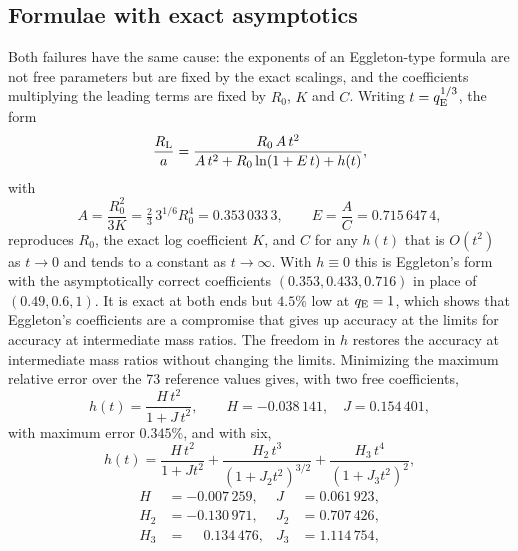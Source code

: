 \documentclass[twocolumn]{aastex702}
\newcommand{\qE}{q_{\rm E}}
\newcommand{\RL}{R_{\rm L}}
\begin{document}
\subsection{Formulae with exact asymptotics}

Both failures have the same cause: the exponents of an Eggleton-type formula are not free parameters but are fixed by the exact scalings, and the coefficients multiplying the leading terms are fixed by $R_0$, $K$ and $C$. Writing $t=\qE^{1/3}$, the form
\begin{equation}
\frac{\RL}{a}=\frac{R_0\,A\,t^2}{A\,t^2+R_0\ln(1+E\,t)+h(t)},
\label{eq:fit}
\end{equation}
with
\begin{equation}
A=\frac{R_0^2}{3K}=\tfrac23\,3^{1/6}R_0^4=0.353\,033\,3,\qquad E=\frac AC=0.715\,647\,4,
\end{equation}
reproduces $R_0$, the exact log coefficient $K$, and $C$ for any $h(t)$ that is $O(t^2)$ as $t\to0$ and tends to a constant as $t\to\infty$. With $h\equiv0$ this is Eggleton's form with the asymptotically correct coefficients $(0.353,0.433,0.716)$ in place of $(0.49,0.6,1)$. It is exact at both ends but $4.5\%$ low at $\qE=1$, which shows that Eggleton's coefficients are a compromise that gives up accuracy at the limits for accuracy at intermediate mass ratios. The freedom in $h$ restores the accuracy at intermediate mass ratios without changing the limits. Minimizing the maximum relative error over the 73 reference values gives, with two free coefficients,
\begin{equation}
h(t)=\frac{H\,t^2}{1+J\,t^2},\qquad H=-0.038\,141,\quad J=0.154\,401,
\label{eq:h2}
\end{equation}
with maximum error $0.345\%$, and with six,
\begin{equation}
h(t)=\frac{H\,t^2}{1+Jt^2}+\frac{H_2\,t^3}{(1+J_2t^2)^{3/2}}+\frac{H_3\,t^4}{(1+J_3t^2)^{2}},
\label{eq:h6}
\end{equation}
\begin{equation}
\begin{aligned}
H&=-0.007\,259, & J&=0.061\,923,\\
H_2&=-0.130\,971, & J_2&=0.707\,426,\\
H_3&=\phantom{-}0.134\,476, & J_3&=1.114\,754,
\end{aligned}
\end{equation}
\end{document}
